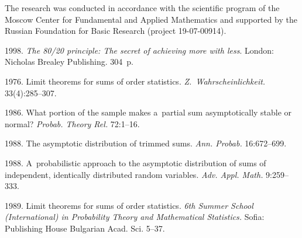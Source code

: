 



\Ack
\noindent
The research was conducted in accordance with the scientific program 
of the Moscow Center for Fundamental and Applied Mathematics and 
supported by the Russian Foundation for Basic Research (project 19-07-00914).






 \begin{multicols}{2}

\renewcommand{\bibname}{\protect\rmfamily References}

{\small\frenchspacing
 {%

 \begin{thebibliography}{99}

 1998.
\textit{The 80/20 principle: The secret of achieving more with less}. 
London: Nicholas Brealey Publishing. 304~p. 

 1976.
Limit theorems for sums of order statistics.
\textit{Z.~Wahrscheinlichkeit.} 33(4):285--307.

 1986.
What portion of the sample makes 
a~partial sum asymptotically stable or normal?
\textit{Probab. Theory Rel.} 72:1--16.

 1988.
The asymptotic distribution of trimmed sums.
\textit{Ann. Probab.} 16:672--699.

 1988.
A~probabilistic approach to the asymptotic
distribution of sums of independent, identically distributed random variables.
\textit{Adv. Appl. Math.} 9:259--333.

 1989. 
Limit theorems for sums of order statistics. 
\textit{6th Summer School (International) in Probability Theory and 
Mathematical Statistics.}
Sofia: Publishing House Bulgarian Acad. Sci. 5--37.


\end{thebibliography}}}
\end{multicols}
